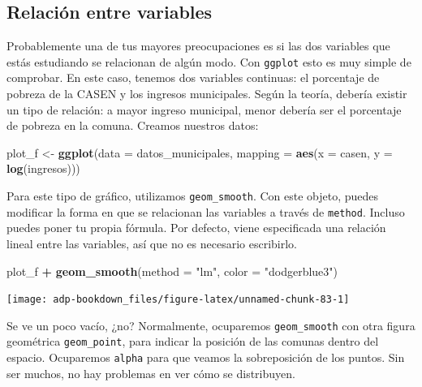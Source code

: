 \documentclass[]{book}
\newenvironment{Shaded}{\begin{snugshade}}{\end{snugshade}}
\newcommand{\DataTypeTok}[1]{\textcolor[rgb]{0.13,0.29,0.53}{#1}}
\newcommand{\KeywordTok}[1]{\textcolor[rgb]{0.13,0.29,0.53}{\textbf{#1}}}
\newcommand{\NormalTok}[1]{#1}
\newcommand{\OperatorTok}[1]{\textcolor[rgb]{0.81,0.36,0.00}{\textbf{#1}}}
\newcommand{\StringTok}[1]{\textcolor[rgb]{0.31,0.60,0.02}{#1}}
\begin{document}
\hypertarget{relacion-entre-variables}{%
\subsection{Relación entre variables}\label{relacion-entre-variables}}

Probablemente una de tus mayores preocupaciones es si las dos variables
que estás estudiando se relacionan de algún modo. Con \texttt{ggplot}
esto es muy simple de comprobar. En este caso, tenemos dos variables
continuas: el porcentaje de pobreza de la CASEN y los ingresos
municipales. Según la teoría, debería existir un tipo de relación: a
mayor ingreso municipal, menor debería ser el porcentaje de pobreza en
la comuna. Creamos nuestros datos:

\begin{Shaded}
\begin{Highlighting}[]
\NormalTok{plot_f <-}\StringTok{ }\KeywordTok{ggplot}\NormalTok{(}\DataTypeTok{data    =}\NormalTok{ datos_municipales, }
                 \DataTypeTok{mapping =} \KeywordTok{aes}\NormalTok{(}\DataTypeTok{x =}\NormalTok{ casen, }\DataTypeTok{y =} \KeywordTok{log}\NormalTok{(ingresos)))}
\end{Highlighting}
\end{Shaded}

Para este tipo de gráfico, utilizamos \texttt{geom\_smooth}. Con este
objeto, puedes modificar la forma en que se relacionan las variables a
través de \texttt{method}. Incluso puedes poner tu propia fórmula. Por
defecto, viene especificada una relación lineal entre las variables, así
que no es necesario escribirlo.

\begin{Shaded}
\begin{Highlighting}[]
\NormalTok{plot_f }\OperatorTok{+}\StringTok{ }
\StringTok{  }\KeywordTok{geom_smooth}\NormalTok{(}\DataTypeTok{method =} \StringTok{"lm"}\NormalTok{, }\DataTypeTok{color =} \StringTok{"dodgerblue3"}\NormalTok{) }
\end{Highlighting}
\end{Shaded}

\begin{center}\texttt{[image: adp-bookdown\_files/figure-latex/unnamed-chunk-83-1]} \end{center}

Se ve un poco vacío, ¿no? Normalmente, ocuparemos \texttt{geom\_smooth}
con otra figura geométrica \texttt{geom\_point}, para indicar la
posición de las comunas dentro del espacio. Ocuparemos \texttt{alpha}
para que veamos la sobreposición de los puntos. Sin ser muchos, no hay
problemas en ver cómo se distribuyen.
\end{document}
